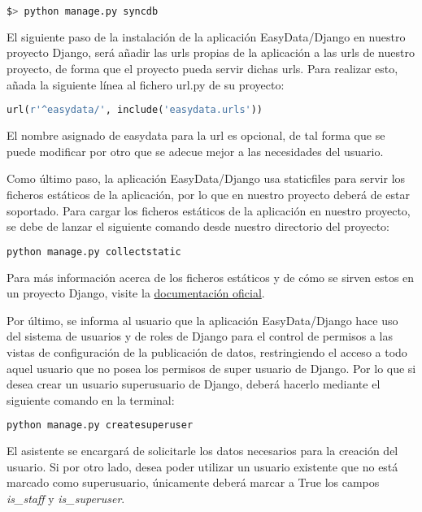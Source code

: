 \begin{lstlisting}[frame=L, language=bash, basicstyle=\footnotesize]
$> python manage.py syncdb
\end{lstlisting}
 
El siguiente paso de la instalación de la aplicación EasyData/Django en nuestro
proyecto Django, será añadir las urls propias de la aplicación a las urls de
nuestro proyecto, de forma que el proyecto pueda servir dichas urls. Para
realizar esto, añada la siguiente línea al fichero url.py de su proyecto:

\begin{lstlisting}[frame=L, language=Python, basicstyle=\footnotesize]
url(r'^easydata/', include('easydata.urls'))
\end{lstlisting}

El nombre asignado de easydata para la url es opcional, de tal forma que se
puede modificar por otro que se adecue mejor a las necesidades del usuario.

Como último paso, la aplicación EasyData/Django usa staticfiles para servir los
ficheros estáticos de la aplicación, por lo que en nuestro proyecto deberá de
estar soportado. Para cargar los ficheros estáticos de la aplicación en nuestro
proyecto, se debe de lanzar el siguiente comando desde nuestro directorio del
proyecto:

\begin{lstlisting}[frame=L, language=bash, basicstyle=\footnotesize]
python manage.py collectstatic
\end{lstlisting}

Para más información acerca de los ficheros estáticos y de cómo se sirven estos
en un proyecto Django, visite la
\href{https://docs.djangoproject.com/en/dev/howto/static-files/}{documentación oficial}.

Por último, se informa al usuario que la aplicación EasyData/Django hace uso del
sistema de usuarios y de roles de Django para el control de permisos a las
vistas de configuración de la publicación de datos, restringiendo el acceso a
todo aquel usuario que no posea los permisos de super usuario de Django. Por lo
que si desea crear un usuario superusuario de Django, deberá hacerlo mediante el
siguiente comando en la terminal:

\begin{lstlisting}[frame=L, language=bash, basicstyle=\footnotesize]
python manage.py createsuperuser
\end{lstlisting}

El asistente se encargará de solicitarle los datos necesarios para la creación
del usuario. Si por otro lado, desea poder utilizar un usuario existente que no
está marcado como superusuario, únicamente deberá marcar a True los campos
\textit{is\_staff} y \textit{is\_superuser}.


